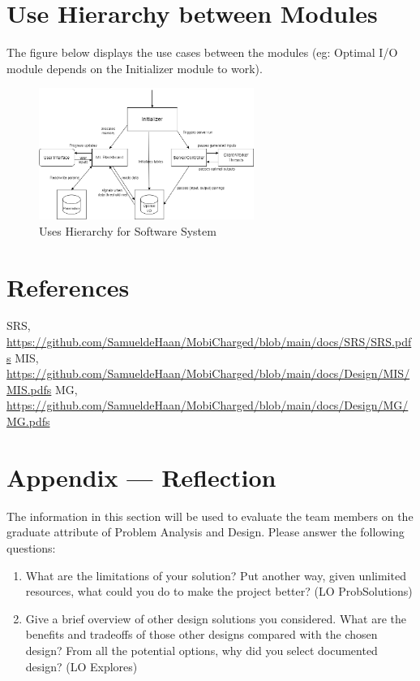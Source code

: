 \documentclass[12pt, titlepage]{article}
\begin{document}
\section{Use Hierarchy between Modules}
The figure below displays the use cases between the modules (eg: Optimal I/O module depends on the Initializer module to work).
\begin{figure}[htp]
  \centering
  \includegraphics[width=7cm]{images/Figure7.png}
  \caption[Uses Hierarchy]{Uses Hierarchy for Software System}
  \label{fig:figure11}
\end{figure}


\section*{References}
SRS, \url{https://github.com/SamueldeHaan/MobiCharged/blob/main/docs/SRS/SRS.pdfs}
MIS, \url{https://github.com/SamueldeHaan/MobiCharged/blob/main/docs/Design/MIS/MIS.pdfs}
MG, \url{https://github.com/SamueldeHaan/MobiCharged/blob/main/docs/Design/MG/MG.pdfs}





\newpage

\newpage{}
\section*{Appendix --- Reflection}

The information in this section will be used to evaluate the team members on the graduate attribute of Problem Analysis and Design. Please answer the following questions: 
\par 
\begin{enumerate}
  \item What are the limitations of your solution? Put another way, given unlimited resources, what could you do to make the project better? (LO ProbSolutions) 
  \item Give a brief overview of other design solutions you considered. What are the benefits and tradeoffs of those other designs compared with the chosen design? From all the potential options, why did you select documented design? (LO Explores)
\end{enumerate}
\end{document}
